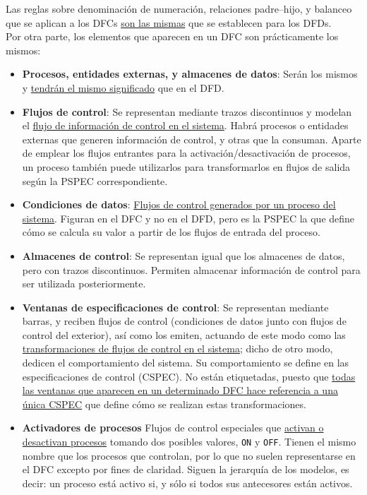 Las reglas sobre denominación de numeración, relaciones padre--hijo, y balanceo que se aplican a los DFCs \uline{son las mismas} que se establecen para los DFDs.\\

Por otra parte, los elementos que aparecen en un DFC son prácticamente los mismos:

\begin{itemize}
    \item \textbf{Procesos, entidades externas, y almacenes de datos}: Serán los mismos y \uline{tendrán el mismo significado} que en el DFD.
    \item \textbf{Flujos de control}: Se representan mediante trazos discontinuos y modelan el \uline{flujo de información de control en el sistema}. Habrá procesos o entidades externas que generen información de control, y otras que la consuman. Aparte de emplear los flujos entrantes para la activación/desactivación de procesos, un proceso también puede utilizarlos para transformarlos en flujos de salida según la PSPEC correspondiente.
    \item \textbf{Condiciones de datos}: \uline{Flujos de control generados por un proceso del sistema}. Figuran en el DFC y no en el DFD, pero es la PSPEC la que define cómo se calcula su valor a partir de los flujos de entrada del proceso.
    \item \textbf{Almacenes de control}: Se representan igual que los almacenes de datos, pero con trazos discontinuos. Permiten almacenar información de control para ser utilizada posteriormente.
    \item \textbf{Ventanas de especificaciones de control}: Se representan mediante barras, y reciben flujos de control (condiciones de datos junto con flujos de control del exterior), así como los emiten, actuando de este modo como las \uline{transformaciones de flujos de control en el sistema}; dicho de otro modo, dedicen el comportamiento del sistema. Su comportamiento se define en las especificaciones de control (CSPEC). No están etiquetadas, puesto que \uline{todas las ventanas que aparecen en un determinado DFC hace referencia a una única CSPEC} que define cómo se realizan estas transformaciones.
    \item \textbf{Activadores de procesos} Flujos de control especiales que \uline{activan o desactivan procesos} tomando dos posibles valores, \texttt{ON} y \texttt{OFF}. Tienen el mismo nombre que los procesos que controlan, por lo que no suelen representarse en el DFC excepto por fines de claridad. Siguen la jerarquía de los modelos, es decir: un proceso está activo si, y sólo si todos sus antecesores están activos.
\end{itemize}

